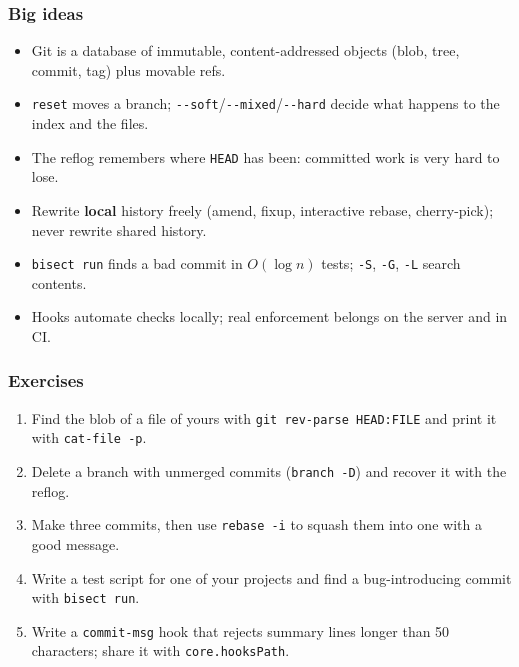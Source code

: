 \documentclass[aspectratio=169,10pt,compress]{beamer}
\begin{document}




\begin{frame}[t,fragile] \frametitle{Big ideas}
  \begin{itemize}
    \item Git is a database of immutable, content-addressed objects (blob, tree, commit, tag) plus movable refs.
    \item \texttt{reset} moves a branch; \texttt{-{}-soft}/\texttt{-{}-mixed}/\texttt{-{}-hard} decide what happens to the index and the files.
    \item The reflog remembers where \texttt{HEAD} has been: committed work is very hard to lose.
    \item Rewrite \textbf{local} history freely (amend, fixup, interactive rebase, cherry-pick); never rewrite shared history.
    \item \texttt{bisect run} finds a bad commit in $O(\log n)$ tests; \texttt{-S}, \texttt{-G}, \texttt{-L} search contents.
    \item Hooks automate checks locally; real enforcement belongs on the server and in CI.
  \end{itemize}
\end{frame}




\begin{frame}[t,fragile] \frametitle{Exercises}
  \begin{enumerate}\small
    \item Find the blob of a file of yours with \texttt{git rev-parse HEAD:FILE} and print it with \texttt{cat-file -p}.
    \item Delete a branch with unmerged commits (\texttt{branch -D}) and recover it with the reflog.
    \item Make three commits, then use \texttt{rebase -i} to squash them into one with a good message.
    \item Write a test script for one of your projects and find a bug-introducing commit with \texttt{bisect run}.
    \item Write a \texttt{commit-msg} hook that rejects summary lines longer than 50 characters; share it with \texttt{core.hooksPath}.
  \end{enumerate}
\end{frame}




\begin{frame}[t,fragile]
	\begin{center}
		\vspace{4cm}
	\end{center}
\end{frame}
\end{document}
